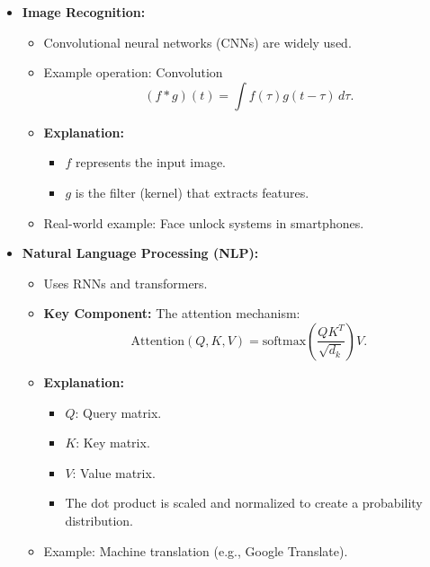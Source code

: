 \documentclass{article}
\begin{document}
\begin{itemize}
    \item \textbf{Image Recognition:}
    \begin{itemize}
        \item Convolutional neural networks (CNNs) are widely used.
        \item Example operation: Convolution 
        \[
        (f * g)(t) = \int f(\tau) g(t-\tau) \, d\tau.
        \]
        \item \textbf{Explanation:}
        \begin{itemize}
            \item \(f\) represents the input image.
            \item \(g\) is the filter (kernel) that extracts features.
        \end{itemize}
        \item Real-world example: Face unlock systems in smartphones.
    \end{itemize}
    
    \item \textbf{Natural Language Processing (NLP):}
    \begin{itemize}
        \item Uses RNNs and transformers.
        \item \textbf{Key Component:} The attention mechanism:
        \[
        \text{Attention}(Q, K, V) = \text{softmax}\left(\frac{QK^T}{\sqrt{d_k}}\right)V.
        \]
        \item \textbf{Explanation:}
        \begin{itemize}
            \item \(Q\): Query matrix.
            \item \(K\): Key matrix.
            \item \(V\): Value matrix.
            \item The dot product is scaled and normalized to create a probability distribution.
        \end{itemize}
        \item Example: Machine translation (e.g., Google Translate).
    \end{itemize}
\end{itemize}
\end{document}
